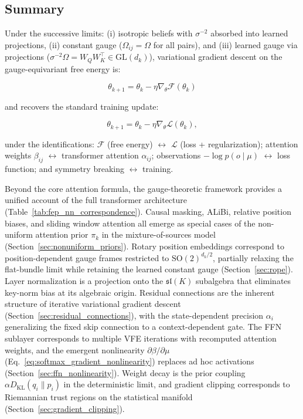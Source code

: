 \documentclass[twoside,11pt]{article}
\begin{document}
\subsection{Summary}

Under the successive limits: (i) isotropic beliefs with $\sigma^{-2}$ absorbed into learned projections, (ii) constant gauge ($\Omega_{ij} = \Omega$ for all pairs), and (iii) learned gauge via projections ($\sigma^{-2}\Omega = W_Q W_K^\top \in \mathrm{GL}(d_k)$), variational gradient descent on the gauge-equivariant free energy is:

\begin{equation}
\theta_{k+1} = \theta_k - \eta \nabla_\theta \mathcal{F}(\theta_k)
\end{equation}

and recovers the standard training update:

\begin{equation}
\theta_{k+1} = \theta_k - \eta \nabla_\theta \mathcal{L}(\theta_k),
\end{equation}

under the identifications: $\mathcal{F}$ (free energy) $\leftrightarrow$ $\mathcal{L}$ (loss + regularization); attention weights $\beta_{ij}$ $\leftrightarrow$ transformer attention $\alpha_{ij}$; observations $-\log p(o \mid \mu)$ $\leftrightarrow$ loss function; and symmetry breaking $\leftrightarrow$ training.

Beyond the core attention formula, the gauge-theoretic framework provides a unified account of the full transformer architecture (Table~\ref{tab:fep_nn_correspondence}). Causal masking, ALiBi, relative position biases, and sliding window attention all emerge as special cases of the non-uniform attention prior $\pi_k$ in the mixture-of-sources model (Section~\ref{sec:nonuniform_priors}). Rotary position embeddings correspond to position-dependent gauge frames restricted to $\mathrm{SO}(2)^{d_k/2}$, partially relaxing the flat-bundle limit while retaining the learned constant gauge (Section~\ref{sec:rope}). Layer normalization is a projection onto the $\mathfrak{sl}(K)$ subalgebra that eliminates key-norm bias at its algebraic origin. Residual connections are the inherent structure of iterative variational gradient descent (Section~\ref{sec:residual_connections}), with the state-dependent precision $\alpha_i$ generalizing the fixed skip connection to a context-dependent gate. The FFN sublayer corresponds to multiple VFE iterations with recomputed attention weights, and the emergent nonlinearity $\partial \beta/\partial \mu$ (Eq.~\ref{eq:softmax_gradient_nonlinearity}) replaces ad hoc activations (Section~\ref{sec:ffn_nonlinearity}). Weight decay is the prior coupling $\alpha D_{\mathrm{KL}}(q_i \| p_i)$ in the deterministic limit, and gradient clipping corresponds to Riemannian trust regions on the statistical manifold (Section~\ref{sec:gradient_clipping}).
\end{document}

